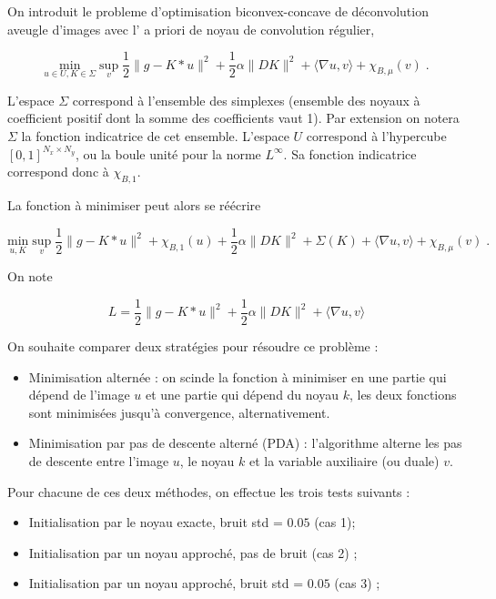 \documentclass[a4paper]{article}
\begin{document}
On introduit le probleme d'optimisation biconvex-concave
de déconvolution aveugle d'images 
avec l' a priori de noyau de convolution régulier,

\[
\underset{u \in U ,K \in \Sigma}{\text{min}} \; \underset{v}{\text{sup}} \;
\frac{1}{2} \| g - K * u\|^2 
+ \frac{1}{2} \alpha \| D K \|^2
+ \langle \nabla u , v \rangle
+ \chi_{B,\mu}(v)
\; .
\]

L'espace $\Sigma$ correspond à l'ensemble des simplexes 
(ensemble des noyaux à coefficient positif dont la somme des coefficients vaut 1).
Par extension on notera $\Sigma$ la fonction indicatrice de cet ensemble.
L'espace $U$ correspond à l'hypercube $[0,1]^{N_x \times N_y}$, ou la boule unité pour la norme $L^\infty$.
Sa fonction indicatrice correspond donc à $\chi_{B,1}$.

La fonction à minimiser peut alors se réécrire

\[
\underset{u ,K }{\text{min}} \; \underset{v}{\text{sup}} \;
\frac{1}{2} \| g - K * u\|^2 
+ \chi_{B,1} (u)
+ \frac{1}{2} \alpha \| D K \|^2
+ \Sigma(K)
+\langle \nabla u , v \rangle
+ \chi_{B,\mu}(v)
\; .
\]

On note

\[
L =\frac{1}{2} \| g - K * u\|^2 
+ \frac{1}{2} \alpha \| D K \|^2
+ \langle \nabla u , v \rangle
\]

On souhaite comparer deux stratégies pour résoudre ce problème :
\begin{itemize}
    \item Minimisation alternée : on scinde la fonction à minimiser en une partie qui dépend de l'image $u$ 
    et une partie qui dépend du noyau $k$, les deux fonctions sont minimisées jusqu'à convergence, alternativement.
    \item Minimisation par pas de descente alterné (PDA) : l'algorithme alterne les pas de descente entre l'image $u$, le noyau $k$ et la variable auxiliaire (ou duale) $v$.
\end{itemize}

Pour chacune de ces deux méthodes, on effectue les trois tests suivants :
\begin{itemize}
     \item Initialisation par le noyau exacte, bruit std = $0.05$  (cas 1);
     \item Initialisation par un noyau approché, pas de bruit (cas 2) ;
      \item Initialisation par un noyau approché, bruit std = $0.05$ (cas 3) ;
\end{itemize}
\end{document}
